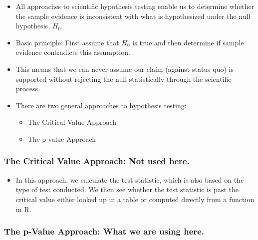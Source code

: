 \documentclass[
  letterpaper,
  DIV=11,
  numbers=noendperiod]{scrreprt}
\providecommand{\tightlist}{%
  \setlength{\itemsep}{0pt}\setlength{\parskip}{0pt}}\usepackage{longtable,booktabs,array}
\begin{document}
\begin{itemize}
\item
  All approaches to scientific hypothesis testing enable us to determine
  whether the sample evidence is inconsistent with what is hypothesized
  under the null hypothesis, \(H_0\).
\item
  Basic principle: First assume that \(H_0\) is true and then determine
  if sample evidence contradicts this assumption.
\item
  This means that we can never assume our claim (against status quo) is
  supported without rejecting the null statistically through the
  scientific process.
\item
  There are two general approaches to hypothesis testing:

  \begin{itemize}
  \tightlist
  \item
    The Critical Value Approach
  \item
    The p-value Approach
  \end{itemize}
\end{itemize}

\subsubsection{The Critical Value Approach: Not used
here.}\label{the-critical-value-approach-not-used-here.}

\begin{itemize}
\tightlist
\item
  In this approach, we calculate the test statistic, which is also based
  on the type of test conducted. We then see whether the test statistic
  is past the critical value either looked up in a table or computed
  directly from a function in R.
\end{itemize}

\subsubsection{The p-Value Approach: What we are using
here.}\label{the-p-value-approach-what-we-are-using-here.}
\end{document}
